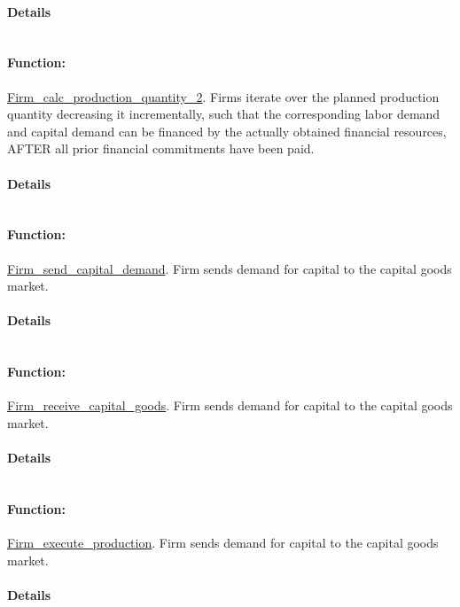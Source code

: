 \documentclass[a4paper,11pt]{article}
\begin{document}
\paragraph{Details}
\begin{verbatim}
\end{verbatim}
\paragraph{Function:}\url{Firm_calc_production_quantity_2}.
Firms iterate over the planned production quantity decreasing it incrementally,
 such that the corresponding labor demand and capital demand can be financed by 
 the actually obtained financial resources, AFTER all prior financial commitments have been paid.
\paragraph{Details}
\begin{verbatim}
\end{verbatim}
\paragraph{Function:}\url{Firm_send_capital_demand}.
Firm sends demand for capital to the capital goods market.
\paragraph{Details}
\begin{verbatim}
\end{verbatim}
\paragraph{Function:}\url{Firm_receive_capital_goods}.
Firm sends demand for capital to the capital goods market.
\paragraph{Details}
\begin{verbatim}
\end{verbatim}
\paragraph{Function:}\url{Firm_execute_production}.
Firm sends demand for capital to the capital goods market.
\paragraph{Details}
\begin{verbatim}
\end{verbatim}
\end{document}
